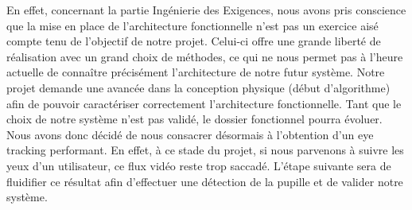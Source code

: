\vspace*{1cm}

En effet, concernant la partie Ingénierie des Exigences, nous avons pris conscience que la mise en place de l'architecture fonctionnelle n'est pas un exercice aisé compte tenu de l'objectif de notre projet. Celui-ci offre une grande liberté de réalisation avec un grand choix de méthodes, ce qui ne nous permet pas à l'heure actuelle de connaître précisément l'architecture de notre futur système. Notre projet demande une avancée dans la conception physique (début d'algorithme) afin de pouvoir caractériser correctement l'architecture fonctionnelle. Tant que le choix de notre système n'est pas validé, le dossier fonctionnel pourra évoluer. Nous avons donc décidé de nous consacrer désormais à l'obtention d'un eye tracking performant. En effet, à ce stade du projet, si nous parvenons à suivre les yeux d'un utilisateur, ce flux vidéo reste trop saccadé. L'étape suivante sera de fluidifier ce résultat afin d'effectuer une détection de la pupille et de valider notre système.

